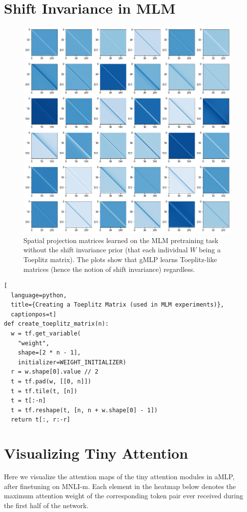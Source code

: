 \documentclass{article}
\newcommand{\gffn}{gMLP\xspace}
\begin{document}
\FloatBarrier
\section{Shift Invariance in MLM}
\label{sec:shift-invariance}

\begin{figure}[h]
    \centering
    \includegraphics[width=0.9\linewidth]{figures/tplz.png}
    \caption{Spatial projection matrices learned on the MLM pretraining task without the shift invariance prior (that each individual $W$ being a Toeplitz matrix). The plots show that \gffn learns Toeplitz-like matrices (hence the notion of shift invariance) regardless.}
    \label{fig:mlm-no-tplz}
\end{figure}

\FloatBarrier

\begin{lstlisting}[
  language=python,
  title={Creating a Toeplitz Matrix (used in MLM experiments)},
  captionpos=t]
def create_toeplitz_matrix(n):
  w = tf.get_variable(
    "weight",
    shape=[2 * n - 1],
    initializer=WEIGHT_INITIALIZER)
  r = w.shape[0].value // 2
  t = tf.pad(w, [[0, n]])
  t = tf.tile(t, [n])
  t = t[:-n]
  t = tf.reshape(t, [n, n + w.shape[0] - 1])
  return t[:, r:-r]
\end{lstlisting}

\FloatBarrier
\section{Visualizing Tiny Attention}
\label{sec:visualize-tiny-attn}
Here we visualize the attention maps of the tiny attention modules in aMLP, after finetuning on MNLI-m. Each element in the heatmap below denotes the maximum attention weight of the corresponding token pair ever received during the first half of the network.
\end{document}
